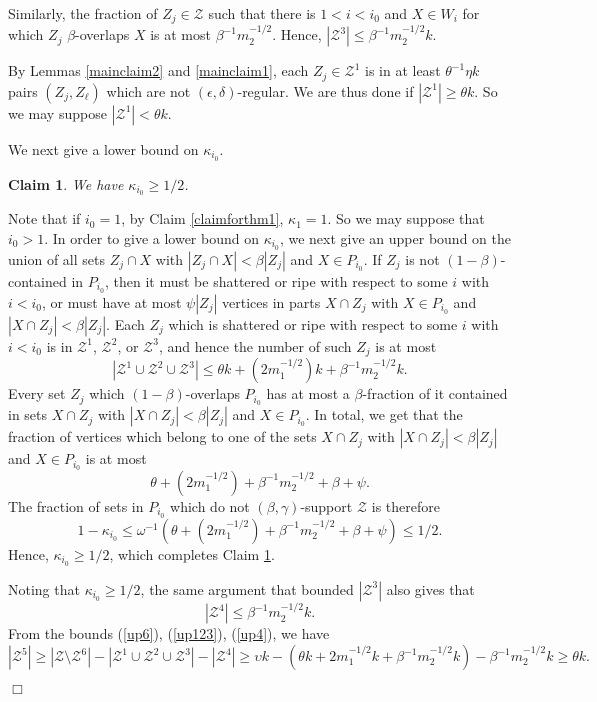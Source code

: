 \documentclass[11pt]{article}
\newtheorem{claim}{Claim}[section]
\newenvironment{proof}
      {\medskip\noindent{\bf Proof:}\hspace{1mm}}
      {\hfill$\Box$\medskip}
\begin{document}
\begin{proof}
Similarly, the fraction of $Z_j \in \mathcal{Z}$ such that there is $1<i < i_0$
and $X \in
W_i$ for which $Z_j$ $\beta$-overlaps $X$ is at most  $\beta^{-1}m_2^{-1/2}$.
Hence, $|\mathcal{Z}^3| \leq \beta^{-1}m_2^{-1/2}k$.

By Lemmas \ref{mainclaim2} and \ref{mainclaim1}, each $Z_j \in \mathcal{Z}^1$
is in at least $\theta^{-1}\eta k$ pairs $(Z_j,Z_{\ell})$ which are not
$(\epsilon,\delta)$-regular. We are thus done if $|\mathcal{Z}^1| \geq \theta
k$. So we may suppose $|\mathcal{Z}^1| < \theta k$.

We next give a lower bound on $\kappa_{i_0}$.

\begin{claim}\label{claimforthm3}
We have $\kappa_{i_0} \geq 1/2$.
\end{claim}
Note that if $i_0=1$, by Claim \ref{claimforthm1}, $\kappa_{1}=1$. So we may
suppose that $i_0>1$. In order to give a
lower bound on $\kappa_{i_0}$, we next give an upper bound on the union of all
sets $Z_j \cap X$ with $|Z_j \cap X| <\beta |Z_j|$ and $X \in P_{i_0}$. If
$Z_j$ is not $(1-\beta)$-contained in $P_{i_0}$, then it must be shattered or
ripe with respect to some $i$ with $i<i_0$, or must have at most $\psi|Z_j|$
vertices in parts $X \cap Z_j$ with $X \in P_{i_0}$ and $|X \cap Z_j|<\beta |Z_j|$.
Each $Z_j$ which is shattered or ripe with respect to some $i$ with $i<i_0$ is
in $\mathcal{Z}^1$, $\mathcal{Z}^2$, or $\mathcal{Z}^3$, and hence the number of such
$Z_j$ is at most
\begin{equation}\label{up123}
| \mathcal{Z}^1 \cup \mathcal{Z}^2 \cup \mathcal{Z}^3| \leq \theta k+
 (2m_1^{-1/2})k + \beta^{-1}m_2^{-1/2}k.
\end{equation}
Every set $Z_j$ which $(1-\beta)$-overlaps $P_{i_0}$ has at most a
$\beta$-fraction of it contained in sets $X \cap Z_j$ with $|X \cap
Z_j|<\beta|Z_j|$ and $X \in P_{i_0}$. In total, we get that the fraction of vertices
which belong to one of the sets $X \cap Z_j$ with $|X \cap Z_j|<\beta |Z_j|$
and $X \in P_{i_0}$ is at most $$\theta  + (2m_1^{-1/2}) +
\beta^{-1}m_2^{-1/2}+\beta+\psi.$$
The fraction of sets in $P_{i_0}$ which do not $(\beta,\gamma)$-support
$\mathcal{Z}$ is therefore $$1-\kappa_{i_0} \leq \omega^{-1}\left(\theta  +
(2m_1^{-1/2}) + \beta^{-1}m_2^{-1/2}+\beta+\psi\right) \leq 1/2.$$ Hence,
$\kappa_{i_0} \geq 1/2$, which completes Claim \ref{claimforthm3}.

Noting that $\kappa_{i_0} \geq 1/2$, the same argument that bounded
$|\mathcal{Z}^3|$ also gives that
\begin{equation}\label{up4}|\mathcal{Z}^4| \leq \beta^{-1} m_{2}^{-1/2}k.
\end{equation} From the bounds (\ref{up6}), (\ref{up123}), (\ref{up4}), we have
$$|\mathcal{Z}^5| \geq |\mathcal{Z}\setminus \mathcal{Z}^6|-|\mathcal{Z}^1 \cup
\mathcal{Z}^2 \cup \mathcal{Z}^3|-|\mathcal{Z}^4|\geq \upsilon k - \left(\theta k+
2m_1^{-1/2}k + \beta^{-1}m_2^{-1/2}k\right)-\beta^{-1} m_{2}^{-1/2}k \geq
\theta k.$$


\end{proof}
\end{document}
